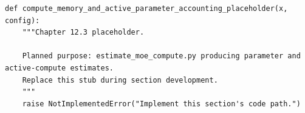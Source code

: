 \begin{lstlisting}[style=bookpython,caption={Planned code placeholder for compute memory and active parameter accounting.},label={lst:ch12-compute-memory-and-active-parameter-accounting}]
def compute_memory_and_active_parameter_accounting_placeholder(x, config):
    """Chapter 12.3 placeholder.

    Planned purpose: estimate_moe_compute.py producing parameter and active-compute estimates.
    Replace this stub during section development.
    """
    raise NotImplementedError("Implement this section's code path.")
\end{lstlisting}
